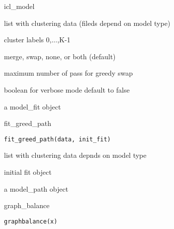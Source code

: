 \documentclass[letterpaper]{book}
\begin{document}
%
\begin{Arguments}
\begin{ldescription}
\item[\code{model}] icl\_model

\item[\code{data}] list with clustering data (fileds depend on model type)

\item[\code{clt}] cluster labels 0,...,K-1

\item[\code{type}] merge, swap, none, or both (default)

\item[\code{nb\_max\_pass}] maximum number of pass for greedy swap

\item[\code{verbose}] boolean for verbose mode default to false
\end{ldescription}
\end{Arguments}
%
\begin{Value}
a model\_fit object
\end{Value}
%
\begin{Description}\relax
fit\_greed\_path
\end{Description}
%
\begin{Usage}
\begin{verbatim}
fit_greed_path(data, init_fit)
\end{verbatim}
\end{Usage}
%
\begin{Arguments}
\begin{ldescription}
\item[\code{data}] list with clustering data depnds on model type

\item[\code{init\_fit}] initial fit object
\end{ldescription}
\end{Arguments}
%
\begin{Value}
a model\_path object
\end{Value}
%
\begin{Description}\relax
graph\_balance
\end{Description}
%
\begin{Usage}
\begin{verbatim}
graphbalance(x)
\end{verbatim}
\end{Usage}
\end{document}
